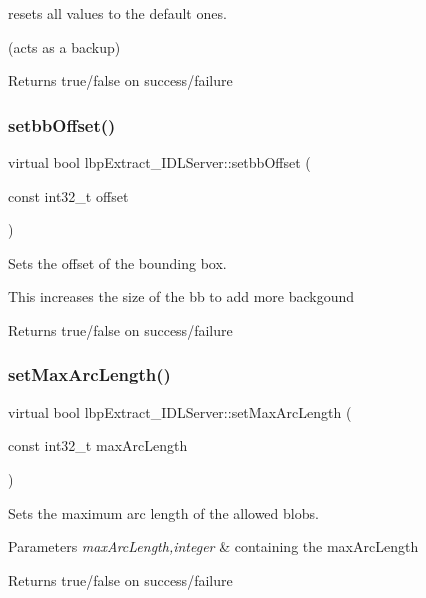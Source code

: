 resets all values to the default ones. 

(acts as a backup) \begin{DoxyReturn}{Returns}
true/false on success/failure 
\end{DoxyReturn}
\mbox{\label{classlbpExtract__IDLServer_aebf9bfaa7a16309244177c4b7b094e2a}} 
\subsubsection{\texorpdfstring{setbbOffset()}{setbbOffset()}}
{\footnotesize\ttfamily virtual bool lbp\+Extract\+\_\+\+I\+D\+L\+Server\+::setbb\+Offset (\begin{DoxyParamCaption}\item[{const int32\+\_\+t}]{offset }\end{DoxyParamCaption})\hspace{0.3cm}{\ttfamily [virtual]}}



Sets the offset of the bounding box. 

This increases the size of the bb to add more backgound \begin{DoxyReturn}{Returns}
true/false on success/failure 
\end{DoxyReturn}
\mbox{\label{classlbpExtract__IDLServer_abc379ba01952949df03f977c74884ade}} 
\subsubsection{\texorpdfstring{setMaxArcLength()}{setMaxArcLength()}}
{\footnotesize\ttfamily virtual bool lbp\+Extract\+\_\+\+I\+D\+L\+Server\+::set\+Max\+Arc\+Length (\begin{DoxyParamCaption}\item[{const int32\+\_\+t}]{max\+Arc\+Length }\end{DoxyParamCaption})\hspace{0.3cm}{\ttfamily [virtual]}}



Sets the maximum arc length of the allowed blobs. 


\begin{DoxyParams}{Parameters}
{\em max\+Arc\+Length,integer} & containing the max\+Arc\+Length \\
\hline
\end{DoxyParams}
\begin{DoxyReturn}{Returns}
true/false on success/failure 
\end{DoxyReturn}
\mbox{\label{classlbpExtract__IDLServer_a81dbd91a1460cdb450a7f7824e6d9953}} 
